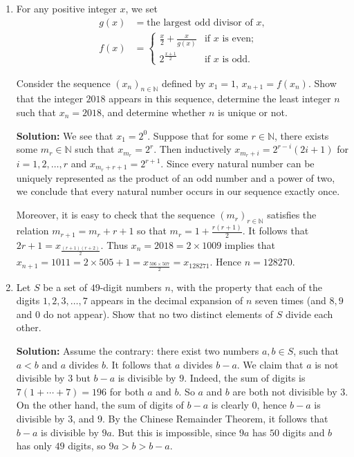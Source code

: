 \documentclass{article}
\newcommand{\solution}[1]{%
\ifsolutions%
    \textbf{Solution: } #1
\fi
}
\begin{document}
\begin{enumerate}
\item For any positive integer $x$, we set
\begin{align*}
    g(x) & = \text{the largest odd divisor of } x, \\
    f(x) & = \begin{cases}
        \frac{x}{2} + \frac{x}{g(x)} & \text{if } x \text{ is even;} \\
        2^{\frac{x+1}{2}} & \text{if } x \text{ is odd.}
    \end{cases}
\end{align*}
    
Consider the sequence ${(x_n)}_{n \in \mathbb{N}}$ defined by $x_1 = 1$, $x_{n+1} = f(x_n)$. Show that the integer $2018$ appears in this sequence, determine the least integer $n$ such that $x_n = 2018$, and determine whether $n$ is unique or not.

\solution{We see that $x_1 = 2^0$. Suppose that for some $r \in \mathbb{N}$, there exists some $m_r \in \mathbb{N}$ such that $x_{m_r} = 2^r$. Then inductively $x_{m_r + i} = 2^{r-i} (2i + 1)$ for $i = 1, 2, \dots, r$ and $x_{m_r + r + 1} = 2^{r + 1}$. Since every natural number can be uniquely represented as the product of an odd number and a power of two, we conclude that every natural number occurs in our sequence exactly once.

Moreover, it is easy to check that the sequence ${(m_r)}_{r \in \mathbb{N}}$ satisfies the relation $m_{r + 1} = m_r + r + 1$ so that $m_r = 1 + \frac{r(r + 1)}{2}$. It follows that $2r + 1 = x_{\frac{(r + 1)(r + 2)}{2}}$. Thus $x_n = 2018 = 2 \times 1009$ implies that $x_{n + 1} = 1011 = 2 \times 505 + 1 = x_{\frac{506 \times 507}{2}} = x_{128271}$. Hence $n = 128270$.}

\item Let $S$ be a set of $49$-digit numbers $n$, with the property that each of the digits $1, 2, 3, \dots, 7$ appears in the decimal expansion of $n$ seven times (and $8, 9$ and $0$ do not appear). Show that no two distinct elements of $S$ divide each other.

\solution{Assume the contrary: there exist two numbers $a, b \in S$, such that $a < b$ and $a$ divides $b$. It follows that $a$ divides $b - a$. We claim that $a$ is not divisible by $3$ but $b - a$ is divisible by $9$. Indeed, the sum of digits is $7(1 + \cdots + 7) = 196$ for both $a$ and $b$. So $a$ and $b$ are both not divisible by $3$. On the other hand, the sum of digits of $b - a$ is clearly $0$, hence $b - a$ is divisible by $3$, and $9$. By the Chinese Remainder Theorem, it follows that $b - a$ is divisible by $9a$. But this is impossible, since $9a$ has $50$ digits and $b$ has only $49$ digits, so $9a > b > b - a$.}


\end{enumerate}
\end{document}
